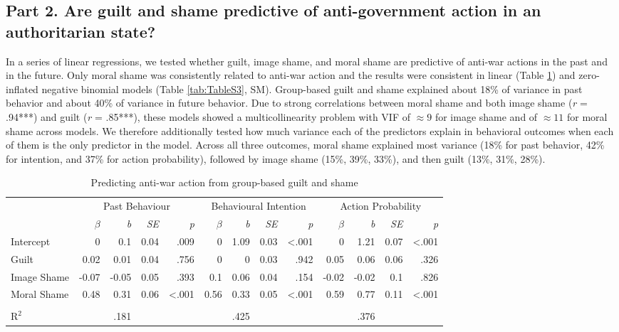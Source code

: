 \documentclass[
]{article}
\begin{document}
\subsection*{Part 2. Are guilt and shame predictive of anti-government action in an authoritarian state?}\label{part-2.-are-guilt-and-shame-predictive-of-anti-government-action-in-an-authoritarian-state}

In a series of linear regressions, we tested whether guilt, image shame, and moral shame are predictive of anti-war actions in the past and in the future. Only moral shame was consistently related to anti-war action and the results were consistent in linear (Table \ref{tab:Table2}) and zero-inflated negative binomial models (Table \ref{tab:TableS3}, SM). Group-based guilt and shame explained about 18\% of variance in past behavior and about 40\% of variance in future behavior. Due to strong correlations between moral shame and both image shame (\emph{r} = .94***) and guilt (\emph{r} = .85***), these models showed a multicollinearity problem with VIF of \(\approx 9\) for image shame and of \(\approx 11\) for moral shame across models. We therefore additionally tested how much variance each of the predictors explain in behavioral outcomes when each of them is the only predictor in the model. Across all three outcomes, moral shame explained most variance (18\% for past behavior, 42\% for intention, and 37\% for action probability), followed by image shame (15\%, 39\%, 33\%), and then guilt (13\%, 31\%, 28\%).

\begin{table}[H]
\centering
\caption{\label{tab:Table2}Predicting anti-war action from group-based guilt and shame}
\centering
\fontsize{8}{10}\selectfont
\begin{tabular}[t]{lrrrrrrrrrrrr}
\toprule
\multicolumn{1}{c}{} & \multicolumn{4}{c}{Past Behaviour} & \multicolumn{4}{c}{Behavioural Intention} & \multicolumn{4}{c}{Action Probability} \\
\cmidrule(l{3pt}r{3pt}){2-5} \cmidrule(l{3pt}r{3pt}){6-9} \cmidrule(l{3pt}r{3pt}){10-13}
\em{ } & \em{$\beta$} & \em{b} & \em{SE} & \em{p} & \em{$\beta$} & \em{b} & \em{SE} & \em{p} & \em{$\beta$} & \em{b} & \em{SE} & \em{p}\\
\midrule
Intercept & 0 & 0.1 & 0.04 & .009 & 0 & 1.09 & 0.03 & <.001 & 0 & 1.21 & 0.07 & <.001\\
Guilt & 0.02 & 0.01 & 0.04 & .756 & 0 & 0 & 0.03 & .942 & 0.05 & 0.06 & 0.06 & .326\\
Image Shame & -0.07 & -0.05 & 0.05 & .393 & 0.1 & 0.06 & 0.04 & .154 & -0.02 & -0.02 & 0.1 & .826\\
Moral Shame & 0.48 & 0.31 & 0.06 & <.001 & 0.56 & 0.33 & 0.05 & <.001 & 0.59 & 0.77 & 0.11 & <.001\\
\midrule\\
R$^{2}$ &  & .181 &  &  &  & .425 &  &  &  & .376 &  & \\
\bottomrule
\end{tabular}
\end{table}
\end{document}
